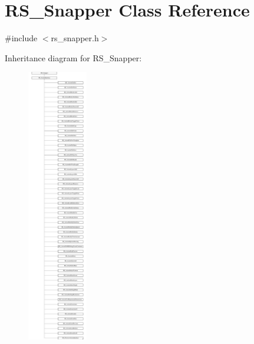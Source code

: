 \hypertarget{classRS__Snapper}{\section{R\-S\-\_\-\-Snapper Class Reference}
\label{classRS__Snapper}
}


{\ttfamily \#include $<$rs\-\_\-snapper.\-h$>$}

Inheritance diagram for R\-S\-\_\-\-Snapper\-:\begin{figure}[H]
\begin{center}
\leavevmode
\includegraphics[height=12.000000cm]{classRS__Snapper}
\end{center}
\end{figure}
